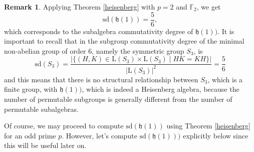\documentclass{amsart}
\theoremstyle{definition}
\newtheorem{remark}[theorem]{Remark}
\numberwithin{equation}{section}
\begin{document}


\begin{remark}Applying Theorem \ref{heisenberg} with $p=2$ and  $\mathbb{F}_2$, we get \[\mathrm{sd}(\mathfrak{h}(1))=\frac{5}{6},\] which corresponds to the subalgebra commutativity degree of $\mathfrak{h}(1))$. %
It is important to recall that in \cite{mt} the subgroup commutativity degree of the minimal non-abelian group of order 6, namely the symmetric group $S_3$, is \[\mathrm{sd}(S_3)=\frac{|\{(H,K) \in \mathrm{L}(S_3) \times \mathrm{L}(S_3) \mid HK=KH\}|}{|\mathrm{L}(S_3)|^2}=\frac{5}{6}\] and this means that there is no structural relationship between $S_3$, which is a finite group,  with $\mathfrak{h}(1))$, which is indeed a Heisenberg algebra,  because the number of permutable subgroups is generally  different   from the number of permutable subalgebras.  \end{remark}

Of course, we may proceed to compute $\mathrm{sd}(\mathfrak{h}(1))$ using Theorem \ref{heisenberg} for an odd prime $p$. However, let's compute $\mathrm{sd}(\mathfrak{h}(1)))$ explicitly below since this will be useful  later on.  
\end{document}
